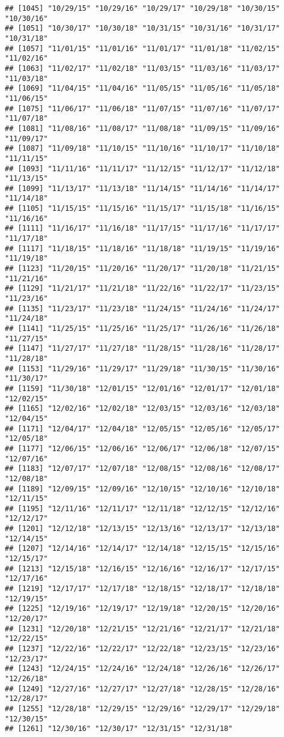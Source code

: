 \documentclass[]{article}
\begin{document}
\begin{verbatim}
## [1045] "10/29/15" "10/29/16" "10/29/17" "10/29/18" "10/30/15" "10/30/16"
## [1051] "10/30/17" "10/30/18" "10/31/15" "10/31/16" "10/31/17" "10/31/18"
## [1057] "11/01/15" "11/01/16" "11/01/17" "11/01/18" "11/02/15" "11/02/16"
## [1063] "11/02/17" "11/02/18" "11/03/15" "11/03/16" "11/03/17" "11/03/18"
## [1069] "11/04/15" "11/04/16" "11/05/15" "11/05/16" "11/05/18" "11/06/15"
## [1075] "11/06/17" "11/06/18" "11/07/15" "11/07/16" "11/07/17" "11/07/18"
## [1081] "11/08/16" "11/08/17" "11/08/18" "11/09/15" "11/09/16" "11/09/17"
## [1087] "11/09/18" "11/10/15" "11/10/16" "11/10/17" "11/10/18" "11/11/15"
## [1093] "11/11/16" "11/11/17" "11/12/15" "11/12/17" "11/12/18" "11/13/15"
## [1099] "11/13/17" "11/13/18" "11/14/15" "11/14/16" "11/14/17" "11/14/18"
## [1105] "11/15/15" "11/15/16" "11/15/17" "11/15/18" "11/16/15" "11/16/16"
## [1111] "11/16/17" "11/16/18" "11/17/15" "11/17/16" "11/17/17" "11/17/18"
## [1117] "11/18/15" "11/18/16" "11/18/18" "11/19/15" "11/19/16" "11/19/18"
## [1123] "11/20/15" "11/20/16" "11/20/17" "11/20/18" "11/21/15" "11/21/16"
## [1129] "11/21/17" "11/21/18" "11/22/16" "11/22/17" "11/23/15" "11/23/16"
## [1135] "11/23/17" "11/23/18" "11/24/15" "11/24/16" "11/24/17" "11/24/18"
## [1141] "11/25/15" "11/25/16" "11/25/17" "11/26/16" "11/26/18" "11/27/15"
## [1147] "11/27/17" "11/27/18" "11/28/15" "11/28/16" "11/28/17" "11/28/18"
## [1153] "11/29/16" "11/29/17" "11/29/18" "11/30/15" "11/30/16" "11/30/17"
## [1159] "11/30/18" "12/01/15" "12/01/16" "12/01/17" "12/01/18" "12/02/15"
## [1165] "12/02/16" "12/02/18" "12/03/15" "12/03/16" "12/03/18" "12/04/15"
## [1171] "12/04/17" "12/04/18" "12/05/15" "12/05/16" "12/05/17" "12/05/18"
## [1177] "12/06/15" "12/06/16" "12/06/17" "12/06/18" "12/07/15" "12/07/16"
## [1183] "12/07/17" "12/07/18" "12/08/15" "12/08/16" "12/08/17" "12/08/18"
## [1189] "12/09/15" "12/09/16" "12/10/15" "12/10/16" "12/10/18" "12/11/15"
## [1195] "12/11/16" "12/11/17" "12/11/18" "12/12/15" "12/12/16" "12/12/17"
## [1201] "12/12/18" "12/13/15" "12/13/16" "12/13/17" "12/13/18" "12/14/15"
## [1207] "12/14/16" "12/14/17" "12/14/18" "12/15/15" "12/15/16" "12/15/17"
## [1213] "12/15/18" "12/16/15" "12/16/16" "12/16/17" "12/17/15" "12/17/16"
## [1219] "12/17/17" "12/17/18" "12/18/15" "12/18/17" "12/18/18" "12/19/15"
## [1225] "12/19/16" "12/19/17" "12/19/18" "12/20/15" "12/20/16" "12/20/17"
## [1231] "12/20/18" "12/21/15" "12/21/16" "12/21/17" "12/21/18" "12/22/15"
## [1237] "12/22/16" "12/22/17" "12/22/18" "12/23/15" "12/23/16" "12/23/17"
## [1243] "12/24/15" "12/24/16" "12/24/18" "12/26/16" "12/26/17" "12/26/18"
## [1249] "12/27/16" "12/27/17" "12/27/18" "12/28/15" "12/28/16" "12/28/17"
## [1255] "12/28/18" "12/29/15" "12/29/16" "12/29/17" "12/29/18" "12/30/15"
## [1261] "12/30/16" "12/30/17" "12/31/15" "12/31/18"
\end{verbatim}
\end{document}
